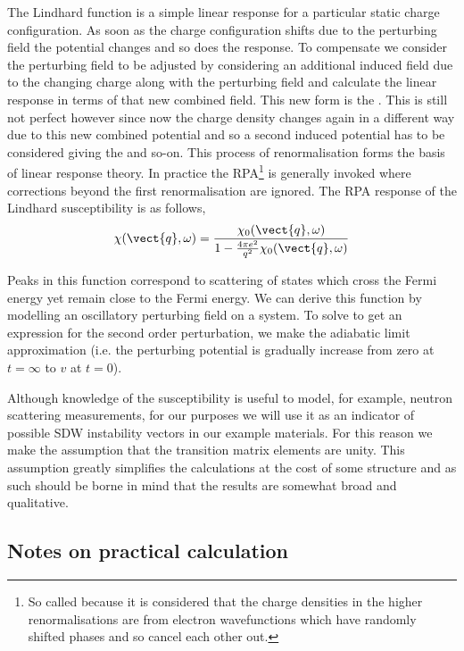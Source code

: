 The Lindhard function is a simple linear response for a particular static charge configuration. As soon as the charge configuration shifts due to the perturbing field the potential changes and so does the response. To compensate we consider the perturbing field to be adjusted by considering an additional induced field due to the changing charge along with the perturbing field and calculate the linear response in terms of that new combined field. This new form is the . This is still not perfect however since now the charge density changes again in a different way due to this new combined potential and so a second induced potential has to be considered giving the  and so-on. This process of renormalisation forms the basis of linear response theory. In practice the \ac{RPA}\footnote{So called because it is considered that the charge densities in the higher renormalisations are from electron wavefunctions which have randomly shifted phases and so cancel each other out.} is generally invoked where corrections beyond the first renormalisation are ignored. The \ac{RPA} response of the Lindhard susceptibility is as follows,
\begin{equation}
    \chi(\vect{q},\omega) = \frac{\chi_0(\vect{q}, \omega)}{1 - \frac{4\pi e^2}{q^2} \chi_0(\vect{q}, \omega)}
\end{equation}


Peaks in this function correspond to scattering of states which cross the Fermi energy yet remain close to the Fermi energy.  We can derive this function by modelling an oscillatory perturbing field on a system. To solve to get an expression for the second order perturbation, we make the adiabatic limit approximation (i.e. the perturbing potential is gradually increase from zero at $t=\infty$ to $v$ at $t=0$).


Although knowledge of the susceptibility is useful to model, for example, neutron scattering measurements, for our purposes we will use it as an indicator of possible \ac{SDW} instability vectors in our example materials. For this reason we make the assumption that the transition matrix elements are unity. This assumption greatly simplifies the calculations at the cost of some structure and as such should be borne in mind that the results are somewhat broad and qualitative.


\subsection{Notes on practical calculation}


